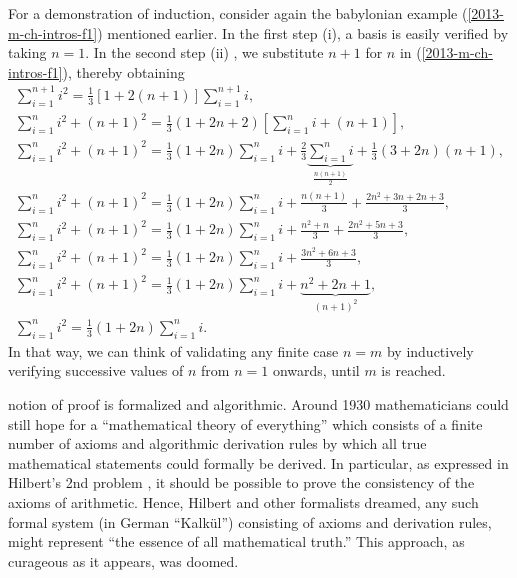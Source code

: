 {\color{OliveGreen}
\bproof
For a demonstration of induction, consider again the babylonian example (\ref{2013-m-ch-intros-f1}) mentioned earlier.
In the first step (i), a basis is easily verified by taking $n=1$.
In the second step (ii) , we substitute $n+1$ for $n$ in (\ref{2013-m-ch-intros-f1}),
thereby obtaining
\begin{equation}
\begin{split}
\sum_{i=1}^{n+1} i^2 = \frac{1}{3}\left[1+2(n+1)\right]\sum_{i=1}^{n+1} i              ,
\\
\sum_{i=1}^{n} i^2 + (n+1)^2 = \frac{1}{3}\left(1+2 n+2\right)\left[\sum_{i=1}^{n} i   +(n+1) \right],
\\
\sum_{i=1}^{n} i^2 + (n+1)^2 = \frac{1}{3}\left(1+2 n\right)\sum_{i=1}^{n} i  + \frac{2}{3}\underbrace{\sum_{i=1}^{n} i}_{\frac{n(n+1)}{2}} + \frac{1}{3}\left(3+2 n\right)(n+1) ,
\\
\sum_{i=1}^{n} i^2 + (n+1)^2 = \frac{1}{3}\left(1+2 n\right)\sum_{i=1}^{n} i  + \frac{n(n+1)}{3}+ \frac{2n^2 +3n + 2n +3}{3} ,
\\
\sum_{i=1}^{n} i^2 + (n+1)^2 = \frac{1}{3}\left(1+2 n\right)\sum_{i=1}^{n} i  + \frac{n^2+n}{3}+ \frac{2n^2 +5n +3}{3} ,
\\
\sum_{i=1}^{n} i^2 + (n+1)^2 = \frac{1}{3}\left(1+2 n\right)\sum_{i=1}^{n} i  +  \frac{3n^2 +6n +3}{3} ,
\\
\sum_{i=1}^{n} i^2 + (n+1)^2 = \frac{1}{3}\left(1+2 n\right)\sum_{i=1}^{n} i  +   \underbrace{n^2 +2n +1}_{(n+1)^2} ,
\\
\sum_{i=1}^{n} i^2  = \frac{1}{3}\left(1+2 n\right)\sum_{i=1}^{n} i
.
\end{split}
\label{2013-m-ch-intros-f2}
\end{equation}
In that way, we can think of validating any finite case $n=m$ by inductively verifying successive values of $n$ from $n=1$ onwards,  until $m$ is reached.

\eproof
}






 notion of proof is formalized and algorithmic.
Around 1930 mathematicians could still hope for a
``mathematical theory of everything''
which consists of a finite number of axioms and algorithmic derivation rules
by which all true mathematical statements could formally be derived.
In particular, as expressed in Hilbert's 2nd problem \citep{hilbert-1900e},
it should be possible to prove the consistency of the axioms of arithmetic.
Hence, Hilbert and other formalists dreamed, any such formal system (in German
``Kalk\"ul'') consisting of axioms and derivation rules, might
represent ``the essence of all mathematical truth.''
This approach, as curageous as it appears, was doomed.

